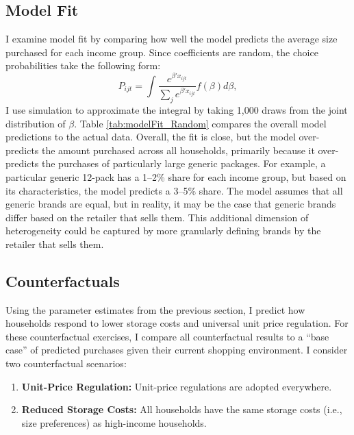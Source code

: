 \documentclass[AER]{AEA_mal}
\begin{document}
\subsection{Model Fit}
I examine model fit by comparing how well the model predicts the average size purchased for each income group. Since coefficients are random, the choice probabilities take the following form:
\begin{equation}
P_{ijt} = \int \frac{e^{\beta' x_{ijt}}}{\sum_j e^{\beta' x_{ijt}}} f(\beta) d\beta,
\end{equation}
I use simulation to approximate the integral by taking 1,000 draws from the joint distribution of $\beta$. Table \ref{tab:modelFit_Random} compares the overall model predictions to the actual data. Overall, the fit is close, but the model over-predicts the amount purchased across all households, primarily because it over-predicts the purchases of particularly large generic packages. For example, a particular generic 12-pack has a 1--2\% share for each income group, but based on its characteristics, the model predicts a 3--5\% share. The model assumes that all generic brands are equal, but in reality, it may be the case that generic brands differ based on the retailer that sells them. This additional dimension of heterogeneity could be captured by more granularly defining brands by the retailer that sells them.



\subsection{Counterfactuals}
\label{counterfactual}

Using the parameter estimates from the previous section, I predict how households respond to lower storage costs and universal unit price regulation. For these counterfactual exercises, I compare all counterfactual results to a ``base case'' of predicted purchases given their current shopping environment. I consider two counterfactual scenarios:

\begin{enumerate}
   \item \textbf{Unit-Price Regulation:} Unit-price regulations are adopted everywhere.
   \item \textbf{Reduced Storage Costs:} All households have the same storage costs (i.e., size preferences) as high-income households.
\end{enumerate}
\end{document}
